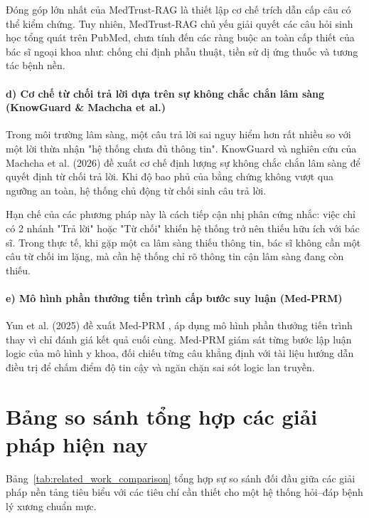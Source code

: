 Đóng góp lớn nhất của MedTrust-RAG là thiết lập cơ chế trích dẫn cấp câu có thể kiểm chứng. Tuy nhiên, MedTrust-RAG chủ yếu giải quyết các câu hỏi sinh học tổng quát trên PubMed, chưa tính đến các ràng buộc an toàn cấp thiết của bác sĩ ngoại khoa như: chống chỉ định phẫu thuật, tiền sử dị ứng thuốc và tương tác bệnh nền.

\paragraph{d) Cơ chế từ chối trả lời dựa trên sự không chắc chắn lâm sàng (KnowGuard \& Machcha et al.)}
Trong môi trường lâm sàng, một câu trả lời sai nguy hiểm hơn rất nhiều so với một lời thừa nhận "hệ thống chưa đủ thông tin". KnowGuard \cite{knowguard2024} và nghiên cứu của Machcha et al. (2026) \cite{knowing_when_abstain_2026} đề xuất cơ chế định lượng sự không chắc chắn lâm sàng để quyết định từ chối trả lời. Khi độ bao phủ của bằng chứng không vượt qua ngưỡng an toàn, hệ thống chủ động từ chối sinh câu trả lời.

Hạn chế của các phương pháp này là cách tiếp cận nhị phân cứng nhắc: việc chỉ có 2 nhánh "Trả lời" hoặc "Từ chối" khiến hệ thống trở nên thiếu hữu ích với bác sĩ. Trong thực tế, khi gặp một ca lâm sàng thiếu thông tin, bác sĩ không cần một câu từ chối im lặng, mà cần hệ thống chỉ rõ thông tin cận lâm sàng đang còn thiếu.

\paragraph{e) Mô hình phần thưởng tiến trình cấp bước suy luận (Med-PRM)}
Yun et al. (2025) đề xuất Med-PRM \cite{medprm2024}, áp dụng mô hình phần thưởng tiến trình thay vì chỉ đánh giá kết quả cuối cùng. Med-PRM giám sát từng bước lập luận logic của mô hình y khoa, đối chiếu từng câu khẳng định với tài liệu hướng dẫn điều trị để chấm điểm độ tin cậy và ngăn chặn sai sót logic lan truyền.

\section{Bảng so sánh tổng hợp các giải pháp hiện nay}

Bảng~\ref{tab:related_work_comparison} tổng hợp sự so sánh đối đầu giữa các giải pháp nền tảng tiêu biểu với các tiêu chí cần thiết cho một hệ thống hỏi--đáp bệnh lý xương chuẩn mực.

